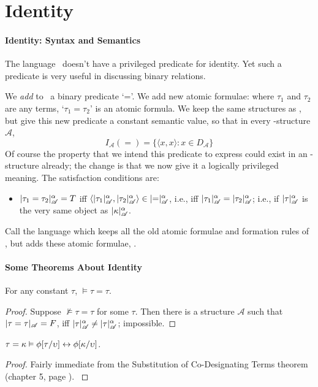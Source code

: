 


	\section{Identity}

	
	\paragraph{Identity: Syntax and Semantics}

	The language \ltwo\ doesn't have a privileged predicate for identity. Yet such a predicate is very useful in discussing binary relations. 

	We \emph{add} to \ltwo\ a binary predicate `='. We add  new atomic formulae: where $\tau_{1}$ and $\tau_{2}$ are any terms, `$\tau_{1}=\tau_{2}$' is an atomic formula.  We keep the same structures as \ltwo, but give this new predicate a constant semantic value, so that in every \ltwo-structure $\mathscr{A}$, \begin{equation}
		I_{\mathscr{A}}({=}) = \{\langle x,x\rangle : x \in D_{\mathscr{A}}\} \tag{=}
	\end{equation}
	Of course the property that we intend this predicate to express could exist in an \ltwo-structure already; the change is that we now  give it a logically privileged meaning.
	The satisfaction conditions are: \begin{itemize}
	\item	$|\tau_{1}=\tau_{2}|^{\alpha}_{\mathscr{A}}=T$ iff $\langle |\tau_{1}|^{\alpha}_{\mathscr{A}},|\tau_{2}|^{\alpha}_{\mathscr{A}}\rangle \in |{=}|^{\alpha}_{\mathscr{A}}$, i.e., iff $|\tau_{1}|^{\alpha}_{\mathscr{A}}=|\tau_{2}|^{\alpha}_{\mathscr{A}}$; i.e., if $|\tau|^{\alpha}_{\mathscr{A}}$ is the very same object as $|\kappa|^{\alpha}_{\mathscr{A}}$.
	\end{itemize}

	Call the language which keeps all the old atomic formulae and formation rules of \ltwo, but adds these atomic formulae, \emph{\lequ}. 
	
\paragraph{Some Theorems About Identity}

\begin{theorem}
	For any constant $\tau$, $\vDash \tau=\tau$. \begin{proof}
		Suppose $\not\vDash\tau=\tau$ for some $\tau$. Then there is a structure $\mathscr{A}$ such that $|\tau=\tau|_{\mathscr{A}}=F$, iff $|\tau|^{\alpha}_{\mathscr{A}}\neq|\tau|^{\alpha}_{\mathscr{A}}$; impossible.
	\end{proof}
\end{theorem} \begin{theorem}
	$\tau=\kappa\vDash \phi[\tau/\upsilon] \leftrightarrow \phi[\kappa/\upsilon]$. \begin{proof}Fairly immediate from the Substitution of Co-Designating Terms theorem (chapter 5, page \pageref{fivesubcod}). \label{scdc}
	\end{proof}
\end{theorem}

